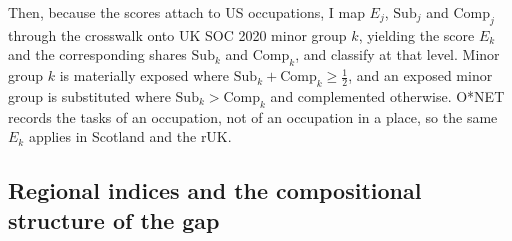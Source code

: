 Then, because the scores attach to US occupations, I map $E_j$, $\mathrm{Sub}_j$ and $\mathrm{Comp}_j$ through the crosswalk onto UK SOC 2020 minor group $k$, yielding the score $E_k$ and the corresponding shares $\mathrm{Sub}_k$ and $\mathrm{Comp}_k$, and classify at that level. Minor group $k$ is materially exposed where $\mathrm{Sub}_k + \mathrm{Comp}_k \ge \tfrac{1}{2}$, and an exposed minor group is substituted where $\mathrm{Sub}_k > \mathrm{Comp}_k$ and complemented otherwise. 
O*NET records the tasks of an occupation, not of an occupation in a place, so the same $E_k$ applies in Scotland and the rUK. 


\subsection{Regional indices and the compositional structure of the gap}\label{sec:indices}

